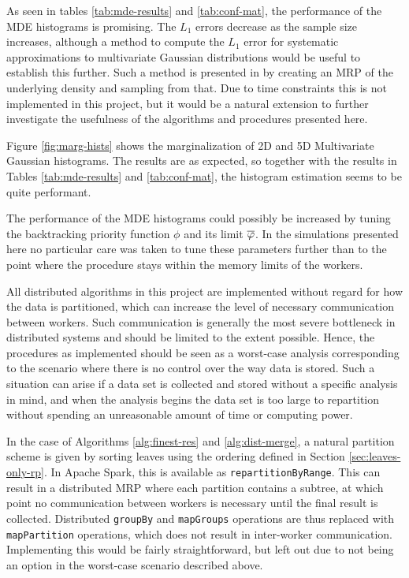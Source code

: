 \documentclass[../scalable-hists.tex]{subfiles}
\begin{document}
  As seen in tables \ref{tab:mde-results} and \ref{tab:conf-mat},
  the performance of the MDE histograms is promising.
  The $L_1$ errors decrease as the sample size increases,
  although a method to compute the $L_1$ error for systematic approximations to multivariate Gaussian distributions
  would be useful to establish this further.
  Such a method is presented in \cite{srp-mde-raaz-teng} by creating an MRP of
  the underlying density and sampling from that.
  Due to time constraints this is not implemented in this project,
  but it would be a natural extension to further investigate the usefulness of
  the algorithms and procedures presented here.

  

  Figure \ref{fig:marg-hists} shows the marginalization of 
  2D and 5D Multivariate Gaussian histograms.
  The results are as expected, so together with the results in 
  Tables \ref{tab:mde-results} and \ref{tab:conf-mat},
  the histogram estimation seems to be quite performant.

  The performance of the MDE histograms could possibly be increased
  by tuning the backtracking priority function $\phi$ and its limit $\overline {\varphi}$.
  In the simulations presented here no particular care was taken to tune
  these parameters further than to the point where
  the procedure stays within the memory limits of the workers.

  All distributed algorithms in this project are
  implemented without regard for how the data is partitioned,
  which can increase the level of necessary communication between workers.
  Such communication is generally the most severe bottleneck in distributed systems and
  should be limited to the extent possible.
  Hence, the procedures as implemented should be seen as
  a worst-case analysis corresponding to the scenario where
  there is no control over the way data is stored.
  Such a situation can arise if a data set is collected and stored without
  a specific analysis in mind,
  and when the analysis begins the data set is too large to repartition without spending
  an unreasonable amount of time or computing power.

  In the case of Algorithms \ref{alg:finest-res} and \ref{alg:dist-merge},
  a natural partition scheme is given by sorting leaves using 
  the ordering defined in Section \ref{sec:leaves-only-rp}.
  In Apache Spark, this is available as \verb|repartitionByRange|.
  This can result in a distributed MRP where each partition contains a subtree,
  at which point no communication between workers is necessary
  until the final result is collected.
  Distributed \verb|groupBy| and \verb|mapGroups| operations are thus replaced with \verb|mapPartition| operations,
  which does not result in inter-worker communication.
  Implementing this would be fairly straightforward,
  but left out due to not being an option in the worst-case scenario described above.
\end{document}
